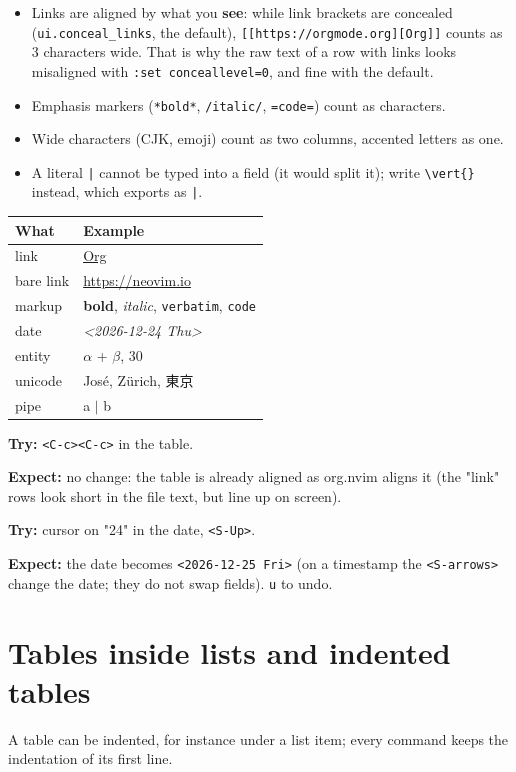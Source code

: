 \begin{itemize}
\item Links are aligned by what you \textbf{see}: while link brackets are concealed
(\texttt{ui.conceal\_links}, the default), \texttt{[[https://orgmode.org][Org]]} counts
as 3 characters wide. That is why the raw text of a row with links looks
misaligned with \texttt{:set conceallevel=0}, and fine with the default.
\item Emphasis markers (\texttt{*bold*}, \texttt{/italic/}, \texttt{=code=}) count as characters.
\item Wide characters (CJK, emoji) count as two columns, accented letters as
one.
\item A literal \texttt{|} cannot be typed into a field (it would split it); write
\texttt{\textbackslash{}vert\{\}} instead, which exports as \texttt{|}.
\end{itemize}

\begin{table}[htbp]
\label{tab:orgaaaef3c}
\centering
\begin{tabular}{ll}
What & Example\\
\hline
link & \href{https://orgmode.org}{Org}\\
bare link & \url{https://neovim.io}\\
markup & \textbf{bold}, \emph{italic}, \texttt{verbatim}, \texttt{code}\\
date & \textit{<2026-12-24 Thu>}\\
entity & \(\alpha\) + \(\beta\), 30\textdegree{}\\
unicode & José, Zürich, 東京\\
pipe & a \(\vert{}\) b\\
\end{tabular}
\end{table}

\textbf{Try:} \texttt{<C-c><C-c>} in the table.

\textbf{Expect:} no change: the table is already aligned as org.nvim aligns it
(the "link" rows look short in the file text, but line up on screen).

\textbf{Try:} cursor on "24" in the date, \texttt{<S-Up>}.

\textbf{Expect:} the date becomes \texttt{<2026-12-25 Fri>} (on a timestamp the
\texttt{<S-arrows>} change the date; they do not swap fields). \texttt{u} to undo.
\section{Tables inside lists and indented tables}
\label{sec:orge417ad7}
A table can be indented, for instance under a list item; every command
keeps the indentation of its first line.

